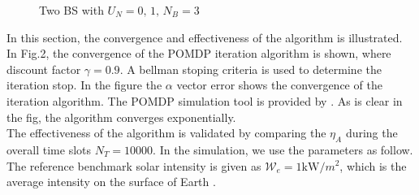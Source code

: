 \documentclass[conference]{IEEEtran}
\begin{document}
\begin{figure}[t]
\centering
{}
\caption{Two BS with \(U_N = 0,\,1,\, N_B = 3\)}
\end{figure}
In this section, the convergence and effectiveness of the algorithm is illustrated.
In Fig.2, the convergence of the POMDP iteration algorithm is shown, where discount factor \(\gamma = 0.9\).
A bellman stoping criteria is used to determine the iteration stop.
In the figure the \(\alpha\) vector error shows the convergence of the iteration algorithm.
The POMDP simulation tool is provided by \cite{pomdptool}.
As is clear in the fig, the algorithm converges exponentially.\\
\indent The effectiveness of the algorithm is validated by comparing the \(\eta_A\)
during the overall time slots \(N_T = 10000\).
In the simulation, we use the parameters as follow.
The reference benchmark solar intensity is given as \(\mathcal{W}_e = 1\mbox{kW}/m^2\),
which is the average intensity on the surface of Earth \cite{electric}.
\end{document}
